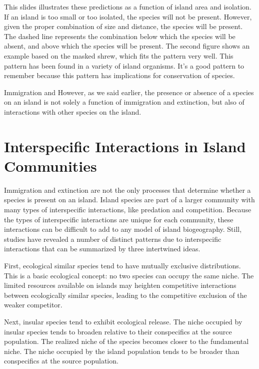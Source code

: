 \documentclass{tufte-handout}
\begin{document}
This slides illustrates these predictions as a function of island area and isolation.  If an island is too small or too isolated, the species will not be present. However, given the proper combination of size and distance, the species will be present.  The dashed line represents the combination below which the species will be absent, and above which the species will be present. The second figure shows an example based on the masked shrew, which fits the pattern very well.  This pattern has been found in a variety of island organisms. It's a good pattern to remember because this pattern has implications for conservation of species.  

Immigration and However, as we said earlier, the presence or absence of a species on an island is not solely a function of immigration and extinction, but also of interactions with other species on the island.

\section{Interspecific Interactions in Island Communities}
Immigration and extinction are not the only processes that determine whether a species is present on an island.  Island species are part of a larger community with many types of interspecific interactions, like predation and competition. Because the types of interspecific interactions are unique for each community, these interactions can be difficult to add to any model of island biogeography. Still, studies have revealed a number of distinct patterns due to interspecific interactions that can be summarized by three intertwined ideas.

First, ecological similar species tend to have mutually exclusive distributions.  This is a basic ecological concept: no two species can occupy the same niche.  The limited resources available on islands may heighten competitive interactions between ecologically similar species, leading to the competitive exclusion of the weaker competitor.  

Next,  insular species tend to exhibit ecological release.  The niche occupied by insular species tends to broaden relative to their conspecifics at the source population. The realized niche of the species becomes closer to the fundamental niche. The niche occupied by the island population tends to be broader than conspecifics at the source population.
\end{document}

